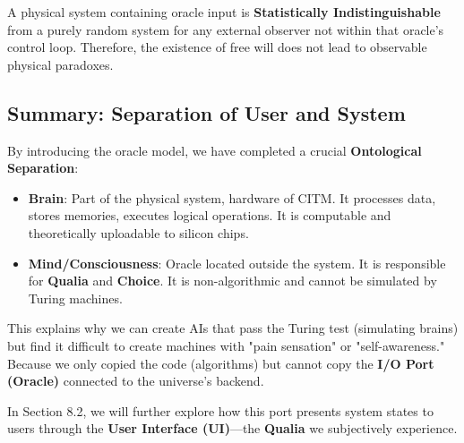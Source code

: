 \begin{theorem}
A physical system containing oracle input is \textbf{Statistically Indistinguishable} from a purely random system for any external observer not within that oracle's control loop. Therefore, the existence of free will does not lead to observable physical paradoxes.
\end{theorem}

\subsection{Summary: Separation of User and System}

By introducing the oracle model, we have completed a crucial \textbf{Ontological Separation}:

\begin{itemize}
\item \textbf{Brain}: Part of the physical system, hardware of CITM. It processes data, stores memories, executes logical operations. It is computable and theoretically uploadable to silicon chips.

\item \textbf{Mind/Consciousness}: Oracle located outside the system. It is responsible for \textbf{Qualia} and \textbf{Choice}. It is non-algorithmic and cannot be simulated by Turing machines.
\end{itemize}

This explains why we can create AIs that pass the Turing test (simulating brains) but find it difficult to create machines with "pain sensation" or "self-awareness." Because we only copied the code (algorithms) but cannot copy the \textbf{I/O Port (Oracle)} connected to the universe's backend.

In Section 8.2, we will further explore how this port presents system states to users through the \textbf{User Interface (UI)}—the \textbf{Qualia} we subjectively experience.

